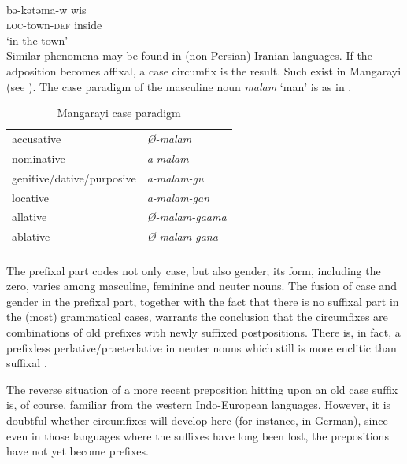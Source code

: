 \ea\label{ex:E75}
\langinfo{\LangAmh}{}{} \\
\gll   bə-kətəma-w  wis  \\
\textsc{loc}-town-\textsc{def}  inside\\
\glt  ‘in the town’\\
\z
\noindent Similar phenomena may be found in (non-Persian) Iranian languages. If the adposition becomes affixal, a case circumfix is the result. Such exist in Mangarayi (see \citealt[57--59]{Merlan1982}). The case paradigm of the masculine noun \textit{malam} ‘man’ is as in .

\begin{table}
\begin{tabular}{ll}
\lsptoprule
accusative & \itshape Ø-malam\\
nominative & \itshape a-malam\\
genitive/dative/purposive & \itshape a-malam-gu\\
locative & \itshape a-malam-gan\\
allative & \itshape Ø-malam-gaama\\
ablative & \itshape Ø-malam-gana\\
\lspbottomrule
\end{tabular}
\caption{Mangarayi case paradigm}\label{tab:Mangarayi}
\end{table}

The prefixal part codes not only case, but also gender; its form, including the zero, varies among masculine, feminine and neuter nouns. The fusion of case and gender in the prefixal part, together with the fact that there is no suffixal part in the (most) grammatical cases, warrants the conclusion that the circumfixes are combinations of old prefixes with newly suffixed postpositions. There is, in fact, a prefixless perlative/praeterlative in neuter nouns which still is more enclitic than suffixal \citep[59]{Merlan1982}.

The reverse situation of a more recent preposition hitting upon an old case suffix is, of course, familiar from the western Indo-European languages. However, it is doubtful whether circumfixes will develop here (for instance, in German), since even in those languages where the suffixes have long been lost, the prepositions have not yet become prefixes.


